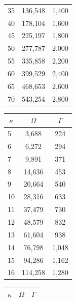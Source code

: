 \documentclass[a4paper,11pt]{article}
\begin{document}
\begin{appendix}
\begin{table}[ht]
{\begin{tabular}{l|cc}
    35                                   & 136,548     & 1,400       \\
    40                                   & 178,104     & 1,600       \\
    45                                   & 225,197     & 1,800       \\
    50                                   & 277,787     & 2,000       \\
    55                                   & 335,858     & 2,200       \\
    60                                   & 399,529     & 2,400       \\
    65                                   & 468,653     & 2,600       \\
    70                                   & 543,254     & 2,800       
  \end{tabular}
  \hspace{1.0cm}
  \begin{tabular}{l|cc}
    \multicolumn{1}{c|}{\(\kappa\)} & \(\Omega\) & \(\Gamma\) \\ \hline
    5                               & 3,688      & 224        \\
    6                               & 6,272      & 294        \\
    7                               & 9,891      & 371        \\
    8                               & 14,636     & 453        \\
    9                               & 20,664     & 540        \\
    10                              & 28,316     & 633        \\
    11                              & 37,479     & 730        \\
    12                              & 48,579     & 832        \\
    13                              & 61,604     & 938        \\
    14                              & 76,798     & 1,048      \\
    15                              & 94,286     & 1,162      \\
    16                              & 114,258    & 1,280      
  \end{tabular}
  \hspace{0.2cm}
  \begin{tabular}{lcc}
    \multicolumn{1}{c|}{\(\kappa\)} & \(\Omega\) & \(\Gamma\) \\ \hline

\end{tabular}}
\end{table}
\end{appendix}
\end{document}
